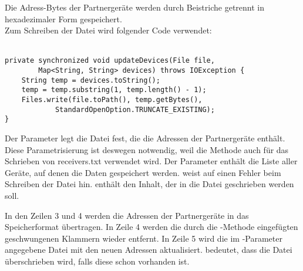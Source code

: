 Die Adress-Bytes der Partnergeräte werden durch Beistriche getrennt in hexadezimaler Form gespeichert. \\ %
Zum Schreiben der Datei wird folgender Code verwendet: \\  \\
\javalisting
\begin{minipage}{\linewidth}
\begin{lstlisting}[caption={Schreiben der Gerätedatei freceivers.txt},captionpos=b]
private synchronized void updateDevices(File file,
		Map<String, String> devices) throws IOException {
	String temp = devices.toString();
	temp = temp.substring(1, temp.length() - 1);
	Files.write(file.toPath(), temp.getBytes(),
			StandardOpenOption.TRUNCATE_EXISTING);
}
\end{lstlisting}
\end{minipage}
\begin{description}
	Der Parameter  legt die Datei fest, die die Adressen der Partnergeräte enthält. Diese Parametrisierung ist deswegen notwendig, weil die Methode  auch für das Schrieben von receivers.txt  verwendet wird.
	Der Parameter  enthält die Liste aller Geräte, auf denen die Daten gespeichert werden.
	 weist auf einen Fehler beim Schreiben der Datei hin.
	 enthält den Inhalt, der in die Datei geschrieben werden soll. 
\end{description}
In den Zeilen 3 und 4 werden die Adressen der Partnergeräte in das Speicherformat übertragen. In Zeile 4 werden die durch die -Methode  eingefügten geschwungenen Klammern wieder entfernt. In Zeile 5 wird die im -Parameter angegebene Datei mit den neuen Adressen aktualisiert.  bedeutet, dass die Datei  überschrieben wird, falls diese schon vorhanden ist.

